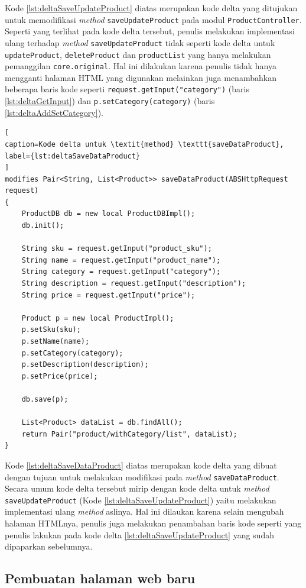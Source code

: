 Kode \ref{lst:deltaSaveUpdateProduct} diatas merupakan kode delta yang ditujukan untuk memodifikasi \textit{method} \texttt{saveUpdateProduct} pada modul \texttt{ProductController}. Seperti yang terlihat pada kode delta tersebut, penulis melakukan implementasi ulang terhadap \textit{method} \texttt{saveUpdateProduct} tidak seperti kode delta untuk \texttt{updateProduct}, \texttt{deleteProduct} dan \texttt{productList} yang hanya melakukan pemanggilan \texttt{core.original}. Hal ini dilakukan karena penulis tidak hanya mengganti halaman HTML yang digunakan melainkan juga menambahkan beberapa baris kode seperti \texttt{request.getInput("category")} (baris \ref{lst:deltaGetInput}) dan \texttt{p.setCategory(category)} (baris \ref{lst:deltaAddSetCategory}).

\begin{lstlisting}[
caption=Kode delta untuk \textit{method} \texttt{saveDataProduct},
label={lst:deltaSaveDataProduct}
]
modifies Pair<String, List<Product>> saveDataProduct(ABSHttpRequest request)
{
	ProductDB db = new local ProductDBImpl();
	db.init();
	
	String sku = request.getInput("product_sku");
	String name = request.getInput("product_name");
	String category = request.getInput("category");
	String description = request.getInput("description");
	String price = request.getInput("price");
	
	Product p = new local ProductImpl();
	p.setSku(sku);
	p.setName(name);
	p.setCategory(category);
	p.setDescription(description);
	p.setPrice(price);
	
	db.save(p);
	
	List<Product> dataList = db.findAll();
	return Pair("product/withCategory/list", dataList);
}
\end{lstlisting}

Kode \ref{lst:deltaSaveDataProduct} diatas merupakan kode delta yang dibuat dengan tujuan untuk melakukan modifikasi pada \textit{method} \texttt{saveDataProduct}. Secara umum kode delta tersebut mirip dengan kode delta untuk \textit{method} \texttt{saveUpdateProduct} (Kode \ref{lst:deltaSaveUpdateProduct}) yaitu melakukan implementasi ulang \textit{method} aslinya. Hal ini dilaukan karena selain mengubah halaman HTMLnya, penulis juga melakukan penambahan baris kode seperti yang penulis lakukan pada kode delta \ref{lst:deltaSaveUpdateProduct} yang sudah dipaparkan sebelumnya.

\subsection{Pembuatan halaman web baru}

